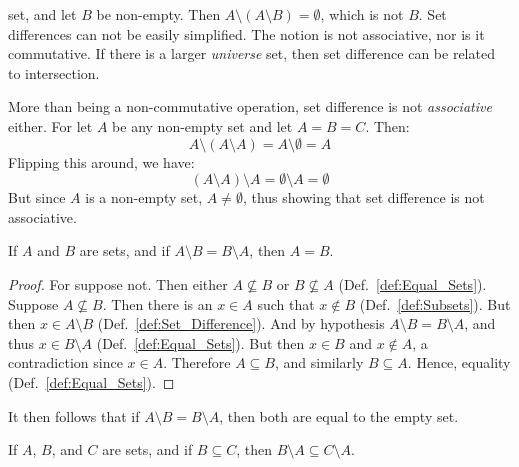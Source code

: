         set, and let $B$ be non-empty. Then
        $A\setminus(A\setminus{B})=\emptyset$, which is not $B$. Set differences
        can not be easily simplified. The notion is not associative, nor is it
        commutative. If there is a larger \textit{universe} set, then set
        difference can be related to intersection.
        \begin{example}
            More than being a non-commutative operation, set difference is not
            \textit{associative} either. For let $A$ be any non-empty set and
            let $A=B=C$. Then:
            \begin{equation}
                A\setminus(A\setminus{A})=A\setminus\emptyset=A
            \end{equation}
            Flipping this around, we have:
            \begin{equation}
                (A\setminus{A})\setminus{A}=\emptyset\setminus{A}=\emptyset
            \end{equation}
            But since $A$ is a non-empty set, $A\ne\emptyset$, thus showing
            that set difference is not associative.
        \end{example}
        \begin{theorem}
            If $A$ and $B$ are sets, and if $A\setminus{B}=B\setminus{A}$, then
            $A=B$.
        \end{theorem}
        \begin{proof}
            For suppose not. Then either $A\nsubseteq{B}$ or $B\nsubseteq{A}$
            (Def.~\ref{def:Equal_Sets}). Suppose $A\nsubseteq{B}$. Then
            there is an $x\in{A}$ such that $x\notin{B}$
            (Def.~\ref{def:Subsets}). But then $x\in{A}\setminus{B}$
            (Def.~\ref{def:Set_Difference}). And by hypothesis
            $A\setminus{B}=B\setminus{A}$, and thus $x\in{B}\setminus{A}$
            (Def.~\ref{def:Equal_Sets}). But then $x\in{B}$ and $x\notin{A}$,
            a contradiction since $x\in{A}$. Therefore $A\subseteq{B}$, and
            similarly $B\subseteq{A}$. Hence, equality
            (Def.~\ref{def:Equal_Sets}).
        \end{proof}
        It then follows that if $A\setminus{B}=B\setminus{A}$, then both are
        equal to the empty set.
        \begin{theorem}
            \label{thm:Set_Difference_from_Superset}%
            If $A$, $B$, and $C$ are sets, and if $B\subseteq{C}$, then
            $B\setminus{A}\subseteq{C}\setminus{A}$.
        \end{theorem}

